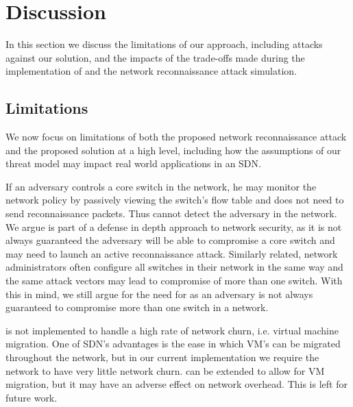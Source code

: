\section{Discussion}
\label{sec:disc}

In this section we discuss the limitations of our approach, including
attacks against our solution, and the impacts of the trade-offs made
during the implementation of \name and the network reconnaissance
attack simulation.

\subsection{Limitations}
We now focus on limitations of both the proposed network reconnaissance
attack and the proposed solution at a high level, including how the
assumptions of our threat model may impact real world applications in an
SDN.

If an adversary controls a core switch in the network, he may monitor the
network policy by passively viewing the switch's flow table and does not
need to send reconnaissance packets. Thus \name cannot detect the
adversary in the network. We argue \name is part of a defense in depth
approach to network security, as it is not always guaranteed the
adversary will be able to compromise a core switch and may need to
launch an active reconnaissance attack. Similarly related, network
administrators often configure all switches in their network in the
same way and the same attack vectors may lead to compromise of more than
one switch. With this in mind, we still argue for the need for \name as
an adversary is not always guaranteed to compromise more than one switch
in a network.

 \name is not implemented to
handle a high rate of network churn, i.e. virtual machine migration.
One of SDN's advantages is the ease in which VM's can be migrated
throughout the network, but in our current implementation we require the
network to have very little network churn. \name can be extended to
allow for VM migration, but it may have an adverse effect on network
overhead. This is left for future work.


